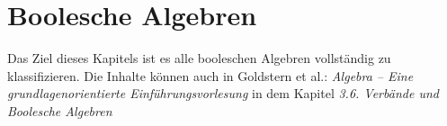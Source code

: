 \chapter{Boolesche Algebren}

Das Ziel dieses Kapitels ist es alle booleschen Algebren vollständig zu klassifizieren. Die Inhalte können auch in Goldstern et al.: \textit{Algebra -- Eine grundlagenorientierte Einführungsvorlesung} in dem Kapitel \textit{3.6. Verbände und Boolesche Algebren}

